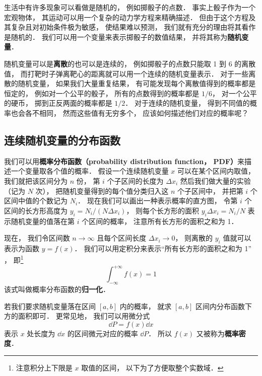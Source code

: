 


生活中有许多现象可以看做是随机的， 例如掷骰子的点数． 事实上骰子作为一个宏观物体， 其运动可以用一个复杂的动力学方程来精确描述． 但由于这个方程及其复杂且对初始条件极为敏感， 使结果难以预测， 我们就有充分的理由将其看作是随机的． 我们可以用一个变量来表示掷骰子的数值结果， 并将其称为\textbf{随机变量}．

随机变量可以是\textbf{离散}的也可以是连续的， 例如掷骰子的点数只能取 1 到 6 的离散值， 而打靶时子弹离靶心的距离就可以用一个连续的随机变量表示． 对于一些离散的随机变量， 如果我们大量重复结果， 有可能发现每个离散值得到的概率都是恒定的， 例如对一个公平的骰子， 所有的点数得到的概率都是 $1/6$， 对一个公平的硬币， 掷到正反两面的概率都是 $1/2$． 对于连续的随机变量， 得到不同值的概率也会各不相同， 然而这些值有无穷多个， 应该如何描述他们对应的概率呢？

\subsection{连续随机变量的分布函数}
我们可以用\textbf{概率分布函数（probability distribution function， PDF）}来描述一个变量取各个值的概率． 假设一个连续随机变量 $x$ 可以在某个区间内取值， 我们就把该区间分为 $n$ 份， 第 $i$ 个子区间的长度为 $\Delta x_i$ 然后我们做大量的实验（记为 $N$ 次）， 把随机变量得到的每个值分类归入这 $n$ 个子区间中， 并把第 $i$ 个区间中值的个数记为 $N_i$． 现在我们可以画出一种表示概率的直方图， 令第 $i$ 个区间的长方形高度为 $y_i = N_i/(N \Delta x_i)$， 则每个长方形的面积 $y_i \Delta x_i = N_i/N$ 表示随机变量的值落在第 $i$ 个区间的概率， 注意所有长方形的面积之和为 1．


现在， 我们令区间数 $n\to \infty$ 且每个区间长度 $\Delta x_i \to 0$， 则离散的 $y_i$ 值就可以表示为函数 $y = f(x)$． 我们可以用定积分来表示“所有长方形的面积之和为 1” ， 即\footnote{注意积分上下限是 $x$ 取值的区间， 以下为了方便取整个实数域．}
\begin{equation}
\int_{-\infty}^{+\infty} f(x) = 1
\end{equation}
该式叫做概率分布函数的\textbf{归一化}．

若我们要求随机变量落在区间 $[a,b]$ 内的概率， 就求 $[a,b]$ 区间内分布函数下方的面积即可． 更常见地， 我们可以用微分式
\begin{equation}
\dd{P} = f(x) \dd{x}
\end{equation}
表示 $x$ 处长度为 $\dd{x}$ 的区间微元对应的概率 $\dd{P}$． 所以 $f(x)$ 又被称为\textbf{概率密度}．

